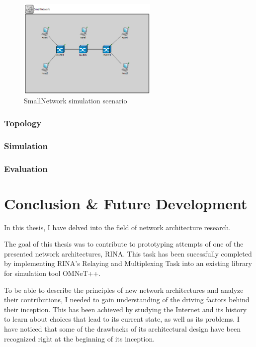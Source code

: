        \begin{figure}[H]
            \begin{center}
                \includegraphics[width=0.6\textwidth]{fig/examples-smallnetwork.png}
              \caption{SmallNetwork simulation scenario}
              \label{fig:examples:smallnetwork}
            \end{center}
        \end{figure}

        \subsection{Topology}

        \subsection{Simulation}

        \subsection{Evaluation}


\chapter{Conclusion \& Future Development}\label{conclusion}

    In this thesis, I have delved into the field of network architecture research.

    The goal of this thesis was to contribute to prototyping attempts of one of the presented network architectures, RINA. This task has been sucessfully completed by implementing RINA's Relaying and Multiplexing Task into an existing library for simulation tool OMNeT++.

    To be able to describe the principles of new network architectures and analyze their contributions, I needed to gain understanding of the driving factors behind their inception. This has been achieved by studying the Internet and its history to learn about choices that lead to its current state, as well as its problems. I have noticed that some of the drawbacks of its architectural design have been recognized right at the beginning of its inception.

